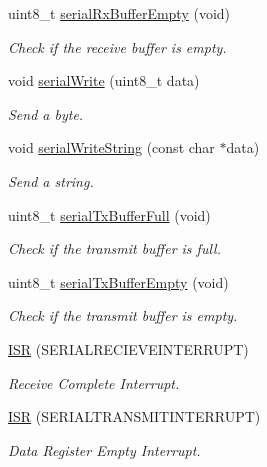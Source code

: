 \begin{DoxyCompactItemize}
uint8\-\_\-t \hyperlink{group__uart_gadb8b3dcb37273bc7b6020036c6cc042c}{serial\-Rx\-Buffer\-Empty} (void)
\begin{DoxyCompactList}\small\item\em Check if the receive buffer is empty. \end{DoxyCompactList}\item 
void \hyperlink{group__uart_ga66f8906eba5f8b0fa6ead524b9f01498}{serial\-Write} (uint8\-\_\-t data)
\begin{DoxyCompactList}\small\item\em Send a byte. \end{DoxyCompactList}\item 
void \hyperlink{group__uart_gaf75ad80708724751008f68ae264d60cf}{serial\-Write\-String} (const char $\ast$data)
\begin{DoxyCompactList}\small\item\em Send a string. \end{DoxyCompactList}\item 
uint8\-\_\-t \hyperlink{group__uart_ga61a4c50b32168a7c42f48f8bc70694e9}{serial\-Tx\-Buffer\-Full} (void)
\begin{DoxyCompactList}\small\item\em Check if the transmit buffer is full. \end{DoxyCompactList}\item 
uint8\-\_\-t \hyperlink{group__uart_gafc7ede165d9cdfc994180efde88da38d}{serial\-Tx\-Buffer\-Empty} (void)
\begin{DoxyCompactList}\small\item\em Check if the transmit buffer is empty. \end{DoxyCompactList}\item 
\hyperlink{group__uart_ga7a36d30320b27d7d863762b7e54b540d}{I\-S\-R} (S\-E\-R\-I\-A\-L\-R\-E\-C\-I\-E\-V\-E\-I\-N\-T\-E\-R\-R\-U\-P\-T)
\begin{DoxyCompactList}\small\item\em Receive Complete Interrupt. \end{DoxyCompactList}\item 
\hyperlink{group__uart_gac456aaea36551ccfea05338b693f6f82}{I\-S\-R} (S\-E\-R\-I\-A\-L\-T\-R\-A\-N\-S\-M\-I\-T\-I\-N\-T\-E\-R\-R\-U\-P\-T)
\begin{DoxyCompactList}\small\item\em Data Register Empty Interrupt. \end{DoxyCompactList}\end{DoxyCompactItemize}
